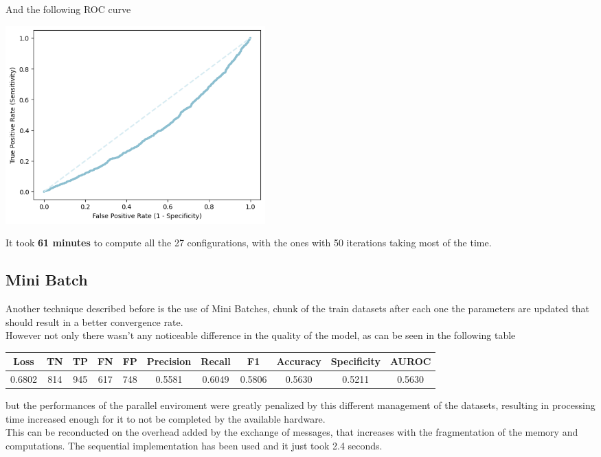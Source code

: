 \documentclass[
	letterpaper, %
	10pt, %
]{class}
\begin{document}
And the following ROC curve

\begin{center}
    \includegraphics[width=10cm]{../images/parallel_roc.png}
\end{center}

It took \textbf{61 minutes} to compute all the 27 configurations, with the ones with 50 iterations taking most of the time.

\subsection{Mini Batch}

Another technique described before is the use of Mini Batches, chunk of the train datasets after each one the parameters are updated that should result in a better convergence rate.\\
However not only there wasn't any noticeable difference in the quality of the model, as can be seen in the following table

\begin{center}
    \begin{tabular}{ |c|c|c|c|c|c|c|c|c|c|c| }
        \hline
        Loss   & TN  & TP  & FN  & FP  & Precision & Recall & F1     & Accuracy & Specificity & AUROC  \\
        \hline
        0.6802 & 814 & 945 & 617 & 748 & 0.5581    & 0.6049 & 0.5806 & 0.5630   & 0.5211      & 0.5630 \\
        \hline
    \end{tabular}
\end{center}

but the performances of the parallel enviroment were greatly penalized by this different management of the datasets, resulting in processing time increased enough for it to not be completed by the available hardware.\\
This can be reconducted on the overhead added by the exchange of messages, that increases with the fragmentation of the memory and computations.
The sequential implementation has been used and it just took 2.4 seconds.
\end{document}
